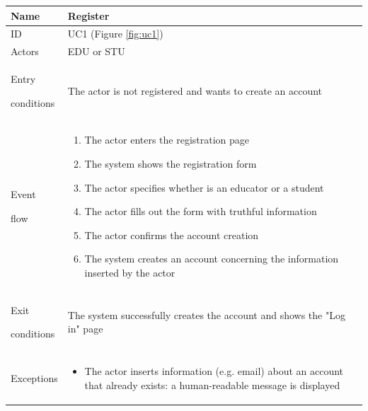 \begin{center}
    \def\arraystretch{1.5}
    \begin{tabular}{| m{2cm} | m{10cm}|}
        \hline
        Name                  & Register                                                                                                                                \\ \hline
        ID                    & UC1 (Figure \ref{fig:uc1})                                                                                                              \\ \hline
        Actors                & EDU or STU                                                                                                                              \\ \hline
        Entry \par conditions & The actor is not registered and wants to create an account                                                                              \\ \hline
        Event \par flow       & \begin{enumerate}
                                    \item The actor enters the registration page
                                    \item The system shows the registration form
                                    \item The actor specifies whether is an educator or a student
                                    \item The actor fills out the form with truthful information
                                    \item The actor confirms the account creation
                                    \item The system creates an account concerning  the information inserted by the actor
                                \end{enumerate}                                                                                                                         \\ \hline
        Exit \par conditions  & The system successfully creates the account and shows the "Log in" page                                                                 \\ \hline
        Exceptions            & \begin{itemize}
                                    \item The actor inserts information (e.g. email) about an account that already exists: a human-readable message is displayed
                                \end{itemize}                                                                                                                           \\ \hline
    \end{tabular}
\end{center}

